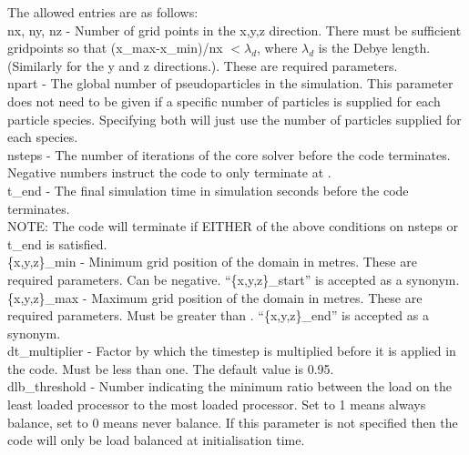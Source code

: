 The allowed entries are as follows:\\

{\emphtext nx, ny, nz} - Number of grid points in the x,y,z direction. There
must be sufficient gridpoints so that (x\_max-x\_min)/nx $< \lambda_d$, where
$\lambda_d$ is the Debye length. (Similarly for the y and z directions.).
These are required parameters.\\

{\emphtext npart} - The global number of pseudoparticles in the
simulation. This parameter does not need to be given if a specific number
of particles is supplied for each particle species. Specifying both will just
use the number of particles supplied for each species.\\

{\emphtext nsteps} - The number of iterations of the core solver before the
code terminates. Negative numbers instruct the code to only terminate at
.\\

{\emphtext t\_end} - The final simulation time in simulation seconds before the
code terminates.\\

{\emphtext NOTE: The code will terminate if EITHER of the above conditions on
nsteps or t\_end is satisfied.}\\

{\emphtext \{x,y,z\}\_min} - Minimum grid position of the domain in
metres. These are required parameters. Can be negative. ``\{x,y,z\}\_start'' is accepted as a synonym.\\

{\emphtext \{x,y,z\}\_max} - Maximum grid position of the domain in
metres. These are required parameters. Must be greater than
.  ``\{x,y,z\}\_end'' is accepted as a synonym.\\

{\emphtext dt\_multiplier} - Factor by which the timestep is multiplied before
it is applied in the code. Must be less than one. The default value is 0.95.\\

{\emphtext dlb\_threshold} - Number indicating the minimum ratio between the
load on the least loaded processor to the most loaded processor. Set to 1 means
always balance, set to 0 means never balance. If this parameter is not
specified then the code will only be load balanced at initialisation time.\\


